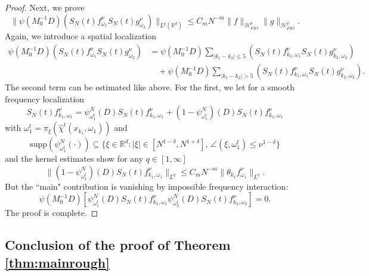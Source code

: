 \documentclass{amsart}
\numberwithin{equation}{section}
\theoremstyle{definition}
\newcommand{\R}{\mathbb{R}}
\begin{document}
\begin{proof}
Next, we prove
\begin{equation*}
    \| \psi(M_0^{-1} D) (S_N(t) f_{\omega_1}^{\nu} S_N(t) g_{\omega_2}^{\nu}) \|_{L^q(\R^d)} \leq C_m N^{-m} \| f \|_{\mathcal{H}^p_{FIO}} \| g \|_{\mathcal{H}^p_{FIO}}.
\end{equation*}
Again, we introduce a spatial localization
\begin{equation*}
\begin{split}
    \psi(M_0^{-1} D) (S_N(t) f_{\omega_1}^{\nu} S_N(t) g_{\omega_2}^{\nu}) &= \psi(M_0^{-1} D) \sum_{|k_1-k_2| \leq 5} (S_N(t) f_{k_1,\omega_1}^{\nu} S_N(t) g_{k_2,\omega_2}^{\nu}) \\
    &\quad + \psi(M_0^{-1} D) \sum_{|k_1-k_2| > 5} (S_N(t) f_{k_1,\omega_1}^{\nu} S_N(t) g_{k_2,\omega_2}^{\nu}).
\end{split}
\end{equation*}
The second term can be estimated like above. For the first, we let for a smooth frequency localization
\begin{equation*}
    S_N(t) f_{k_1,\omega_1}^{\nu} = \psi_{\omega_1^t}^N(D) S_N(t) f_{k_1,\omega_1}^{\nu} + (1-\psi^N_{\omega_1^t})(D) S_N(t) f_{k_1,\omega_1}^{\nu}
\end{equation*}
with $\omega_1^t = \pi_{\xi}(\hat{\chi}^t(x_{k_1},\omega_1))$ and
\begin{equation*}
    \text{supp}(\psi^N_{\omega_1^t}(\cdot)) \subseteq \{ \xi \in \R^d : |\xi| \in [N^{1-\delta},N^{1+\delta}], \, \angle(\xi,\omega_1^t) \leq \nu^{1-\delta} \}
\end{equation*}
and the kernel estimates show for any $q \in [1,\infty]$
\begin{equation*}
    \| (1-\psi_{\omega_1^t}^N)(D) S_N(t) f_{k_1,\omega_1}^{\nu} \|_{L^q} \leq C_m N^{-m} \| \theta_{k_1} f_{\omega_1}^{\nu} \|_{L^q}.
\end{equation*}
But the ``main" contribution is vanishing by impossible frequency interaction:
\begin{equation*}
    \psi(M_0^{-1} D) [\psi_{\omega_1^t}^N(D) S_N(t) f_{k_1,\omega_1}^{\nu} \psi^N_{\omega_2^t}(D) S_N(t) f_{k_2,\omega_2}^{\nu}] = 0.
\end{equation*}
The proof is complete.
\end{proof}


\subsection{Conclusion of the proof of Theorem \ref{thm:mainrough}}\label{subsec:conclude}
\end{document}
